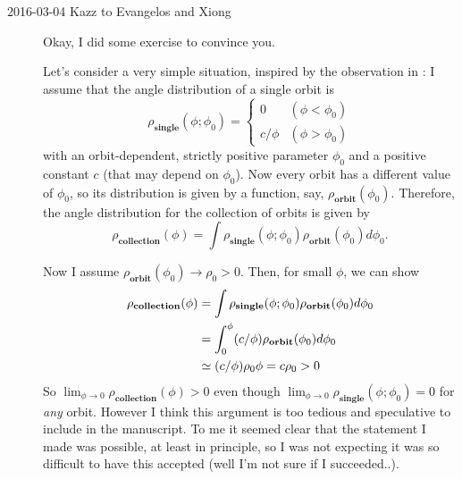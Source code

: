 \begin{description}
\item[2016-03-04 Kazz to Evangelos and Xiong]

Okay, I did some exercise to convince you.

Let's consider a very simple situation, inspired by the observation in : I assume that the angle distribution of a single orbit is
\begin{equation}
\rho_\textbf{single}(\phi; \phi_0) =
\begin{cases} 0 & (\phi < \phi_0) \\ c/\phi & (\phi > \phi_0) \end{cases}
\end{equation}
with an orbit-dependent, strictly positive parameter $\phi_0$ and a positive constant $c$ (that may depend on $\phi_0$).
Now every orbit has a different value of $\phi_0$, so its distribution is given by a function, say, $\rho_\textbf{orbit}(\phi_0)$.
Therefore, the angle distribution for the collection of orbits is given by
\begin{equation}
\rho_\textbf{collection}(\phi) = \int \rho_\textbf{single}(\phi; \phi_0) \rho_\textbf{orbit}(\phi_0) d\phi_0.
\end{equation}

Now I assume $\rho_\textbf{orbit}(\phi_0) \to \rho_0 > 0$.
Then, for small $\phi$, we can show
\begin{align}
\rho_\textbf{collection}(\phi)
 &= \int \rho_\textbf{single}(\phi; \phi_0) \rho_\textbf{orbit}(\phi_0) d\phi_0 \notag \\
 &= \int_0^\phi (c/\phi) \rho_\textbf{orbit}(\phi_0) d\phi_0 \notag \\
 &\simeq (c/\phi) \rho_0 \phi = c\rho_0 > 0
\end{align}
So $\lim_{\phi \to 0} \rho_\textbf{collection}(\phi)>0$ even though
$\lim_{\phi\to 0}\rho_\textbf{single}(\phi; \phi_0) = 0$ for \textit{any} orbit.
However I think this argument is too tedious and speculative to include in the manuscript. To me it seemed clear that the statement I made was possible, at least in principle, so I was not expecting it was so difficult to have this accepted (well I'm not sure if I succeeded..).



\end{description}
